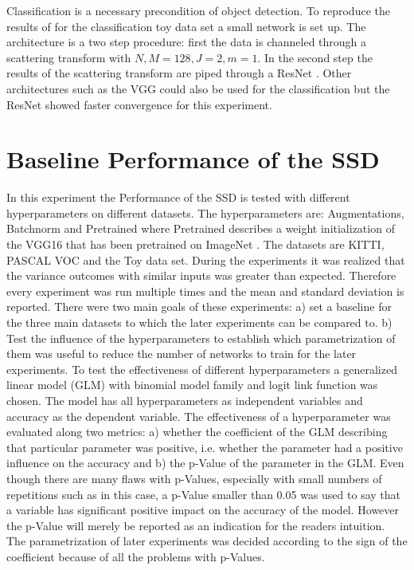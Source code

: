 Classification is a necessary precondition of object detection. To reproduce the results of \cite{ScalingTheScatteringTransform2017} for the classification toy data set a small network is set up. The architecture is a two step procedure: first the data is channeled through a scattering transform with $N,M=128, J=2, m=1$. In the second step the results of the scattering transform are piped through a ResNet \cite{ResNet15}. Other architectures such as the VGG could also be used for the classification but the ResNet showed faster convergence for this experiment. 

\section{Baseline Performance of the SSD}

In this experiment the Performance of the SSD is tested with different hyperparameters on different datasets. The hyperparameters are: Augmentations, Batchnorm and Pretrained where Pretrained describes a weight initialization of the VGG16 that has been pretrained on ImageNet \cite{imagenet_cvpr_09}. The datasets are KITTI, PASCAL VOC and the Toy data set. During the experiments it was realized that the variance outcomes with similar inputs was greater than expected. Therefore every experiment was run multiple times and the mean and standard deviation is reported. There were two main goals of these experiments: a) set a baseline for the three main datasets to which the later experiments can be compared to. b) Test the influence of the hyperparameters to establish which parametrization of them was useful to reduce the number of networks to train for the later experiments. 
To test the effectiveness of different hyperparameters a generalized linear model (GLM) with binomial model family and logit link function was chosen. The model has all hyperparameters as independent variables and accuracy as the dependent variable. The effectiveness of a hyperparameter was evaluated along two metrics: a) whether the coefficient of the GLM describing that particular parameter was positive, i.e. whether the parameter had a positive influence on the accuracy and b) the p-Value of the parameter in the GLM. Even though there are many flaws with p-Values, especially with small numbers of repetitions such as in this case, a p-Value smaller than 0.05 was used to say that a variable has significant positive impact on the accuracy of the model. However the p-Value will merely be reported as an indication for the readers intuition. The parametrization of later experiments was decided according to the sign of the coefficient because of all the problems with p-Values.

